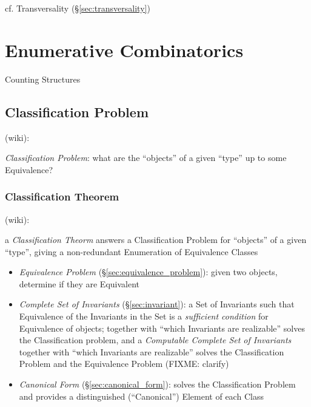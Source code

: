 cf. Transversality (\S\ref{sec:transversality})



\section{Enumerative Combinatorics}
\label{sec:enumerative_combinatorics}

Counting Structures



\subsection{Classification Problem}\label{sec:classification_problem}

(wiki):

\emph{Classification Problem}: what are the ``objects'' of a
given ``type'' up to some Equivalence?



\subsubsection{Classification Theorem}\label{sec:classification_theorem}

(wiki):

a \emph{Classification Theorm} answers a Classification Problem for ``objects''
of a given ``type'', giving a non-redundant Enumeration of Equivalence Classes

\begin{itemize}
  \item \emph{Equivalence Problem} (\S\ref{sec:equivalence_problem}): given two
    objects, determine if they are Equivalent
  \item \emph{Complete Set of Invariants} (\S\ref{sec:invariant}): a Set of
    Invariants such that Equivalence of the Invariants in the Set is a
    \emph{sufficient condition} for Equivalence of objects; together with
    ``which Invariants are realizable'' solves the Classification problem, and a
    \emph{Computable Complete Set of Invariants} together with ``which
    Invariants are realizable'' solves the Classification Problem and the
    Equivalence Problem (FIXME: clarify)
  \item \emph{Canonical Form} (\S\ref{sec:canonical_form}): solves the
    Classification Problem and provides a distinguished (``Canonical'') Element
    of each Class
\end{itemize}


